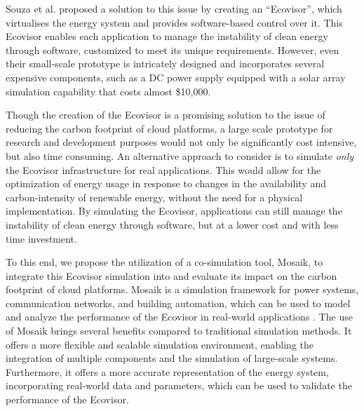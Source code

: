 Souza et al. \cite{souza2023} proposed a solution to this issue by creating an
\enquote{Ecovisor}, which virtualises the energy system and provides
software-based control over it. This Ecovisor enables each application to manage
the instability of clean energy through software, customized to meet its unique
requirements. However, even their small-scale prototype is intricately designed
and incorporates several expensive components, such as a DC power supply
equipped with a solar array simulation capability that costs almost \$10,000.

Though the creation of the Ecovisor is a promising solution to the issue of
reducing the carbon footprint of cloud platforms, a large scale prototype for
research and development purposes would not only be significantly cost
intensive, but also time consuming. An alternative approach to consider is to
simulate \emph{only} the Ecovisor infrastructure for real applications. This
would allow for the optimization of energy usage in response to changes in the
availability and carbon-intensity of renewable energy, without the need for a
physical implementation. By simulating the Ecovisor, applications can still
manage the instability of clean energy through software, but at a lower cost and
with less time investment. \medskip

To this end, we propose the utilization of a co-simulation tool, Mosaik, to
integrate this Ecovisor simulation into and evaluate its impact on the carbon
footprint of cloud platforms. Mosaik is a simulation framework for power
systems, communication networks, and building automation, which can be used to
model and analyze the performance of the Ecovisor in real-world applications
\cite{steinbrink2019}. The use of Mosaik brings several benefits compared to
traditional simulation methods. It offers a more flexible and scalable
simulation environment, enabling the integration of multiple components and the
simulation of large-scale systems. Furthermore, it offers a more accurate
representation of the energy system, incorporating real-world data and
parameters, which can be used to validate the performance of the Ecovisor.
